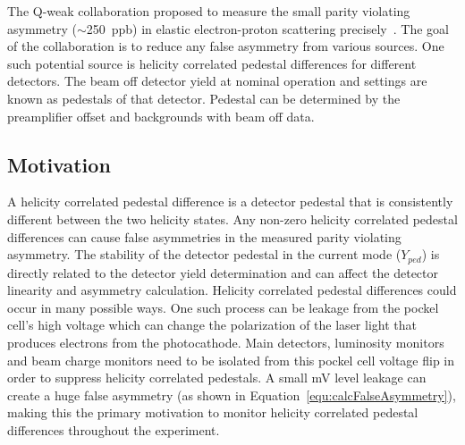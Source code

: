 The Q-weak collaboration proposed to measure the small parity violating asymmetry ($\sim$250~ppb) in elastic electron-proton scattering precisely~\cite{qweak_proposal_2007}. The goal of the collaboration is to reduce any false asymmetry from various sources. One such potential source is helicity correlated pedestal differences for different detectors. The beam off detector yield at nominal operation and settings are known as pedestals of that detector. Pedestal can be determined by the preamplifier offset and backgrounds with beam off data. 

\subsection{Motivation}
\label{Motivation}
A helicity correlated pedestal difference is a detector pedestal that is consistently different between the two helicity states. Any non-zero helicity correlated pedestal differences can cause false asymmetries in the measured parity violating asymmetry. The stability of the detector pedestal in the current mode ($Y_{ped}$) is directly related to the detector yield determination and can affect the detector linearity and asymmetry calculation. 
Helicity correlated pedestal differences could occur in many possible ways. One such process can be leakage from the pockel cell's high voltage which can change the polarization of the laser light that produces electrons from the photocathode. Main detectors, luminosity monitors and beam charge monitors need to be isolated from this pockel cell voltage flip in order to suppress helicity correlated pedestals. A small mV level leakage can create a huge false asymmetry (as shown in Equation~\ref{equ:calcFalseAsymmetry}), making this the primary motivation to monitor helicity correlated pedestal differences throughout the experiment.

